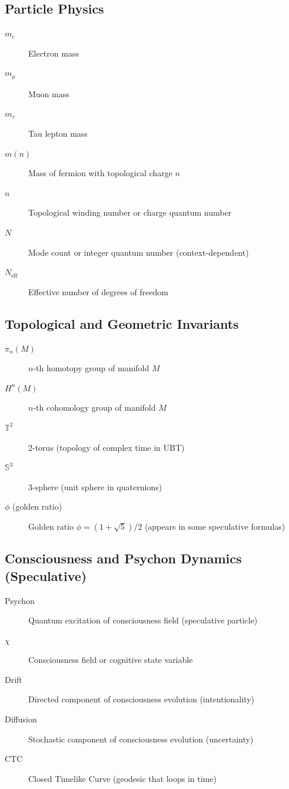 \subsection{Particle Physics}

\begin{description}
\item[$m_e$] Electron mass
\item[$m_\mu$] Muon mass
\item[$m_\tau$] Tau lepton mass
\item[$m(n)$] Mass of fermion with topological charge $n$
\item[$n$] Topological winding number or charge quantum number
\item[$N$] Mode count or integer quantum number (context-dependent)
\item[$N_{\text{eff}}$] Effective number of degrees of freedom
\end{description}

\subsection{Topological and Geometric Invariants}

\begin{description}
\item[$\pi_n(M)$] $n$-th homotopy group of manifold $M$
\item[$H^n(M)$] $n$-th cohomology group of manifold $M$
\item[$\mathbb{T}^2$] 2-torus (topology of complex time in UBT)
\item[$\mathbb{S}^3$] 3-sphere (unit sphere in quaternions)
\item[$\phi$ (golden ratio)] Golden ratio $\phi = (1+\sqrt{5})/2$ (appears in some speculative formulas)
\end{description}

\subsection{Consciousness and Psychon Dynamics (Speculative)}

\begin{description}
\item[Psychon] Quantum excitation of consciousness field (speculative particle)
\item[$\chi$] Consciousness field or cognitive state variable
\item[Drift] Directed component of consciousness evolution (intentionality)
\item[Diffusion] Stochastic component of consciousness evolution (uncertainty)
\item[CTC] Closed Timelike Curve (geodesic that loops in time)
\end{description}


